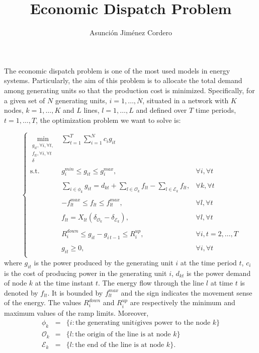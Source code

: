 \documentclass[a4paper,12pt]{article}
\begin{document}
\title{\bf Economic Dispatch Problem}
\author{Asunci\'on Jim\'enez Cordero}
    \date{}
  \maketitle
  
  The economic dispatch problem is one of the most used models in energy systems. Particularly, the aim of this problem is to allocate the total demand among generating units so that the production cost is minimized. Specifically, for a given set of $N$ generating units, $i = 1, \ldots, N$, situated in a network with $K$ nodes, $k = 1, \ldots, K$ and $L$ lines, $l = 1, \ldots, L$ and defined over $T$ time periods, $t = 1, \ldots, T$, the optimization problem we want to solve is:

  \begin{equation}\label{eq: unit commitment problem}
\left\{\begin{array}{lll}
  \min\limits_{\substack{g_{it},\forall i, \forall t,\\
  f_{lt}, \forall i, \forall t\\
  \delta}} &\sum\limits_{t = 1}^T\sum\limits_{i = 1}^N c_ig_{it}&\\
  \text{s.t.} &g_i^{min}\leq g_{it} \leq g_i^{max}, &\forall i, \forall t\\
  \\
  & \sum\limits_{i\in \phi_k} g_{it} = d_{kt} + \sum\limits_{l\in \mathcal{O}_k} f_{lt} - \sum\limits_{l\in \mathcal{E}_k} f_{lt}, &\forall k, \forall t\\
  \\
  & -f_{lt}^{max} \leq f_{lt} \leq f_{lt}^{max}, & \forall l, \forall t\\
  \\
  & f_{lt} = X_{lt}(\delta_{\mathcal{O}_k} - \delta_{\mathcal{E}_k}), & \forall l, \forall t\\
  \\
  & R_i^{down} \leq g_{it} - g_{i\,t-1}\leq R_i^{up}, & \forall i, t = 2, \ldots, T\\
  \\
  & g_{it}\geq 0, & \forall i, \forall t\\
  \end{array}\right.
  \end{equation}
  \noindent where $g_{it}$ is the power produced by the generating unit $i$ at the time period $t$, $c_i$ is the cost of producing power in the generating unit $i$, $d_{kt}$ is the power demand of node $k$ at the time instant $t$. The energy flow through the line $l$ at time $t$ is denoted by $f_{lt}$. It is bounded by $f_{lt}^{max}$ and the sign indicates the movement sense of the energy. The values $R_i^{down}$ and $R_i^{up}$ are respectively the minimum and maximum values of the ramp limits. Moreover,
  \begin{eqnarray*}
  \phi_k &=& \{i: \text{the generating unit} i \text{gives power to the node } k\}\\
  \mathcal{O}_k &=& \{l: \text{the origin of the line is at node } k\}\\
    \mathcal{E}_k &=& \{l: \text{the end of the line is at node } k\}.\\
  \end{eqnarray*}
 
\end{document}
